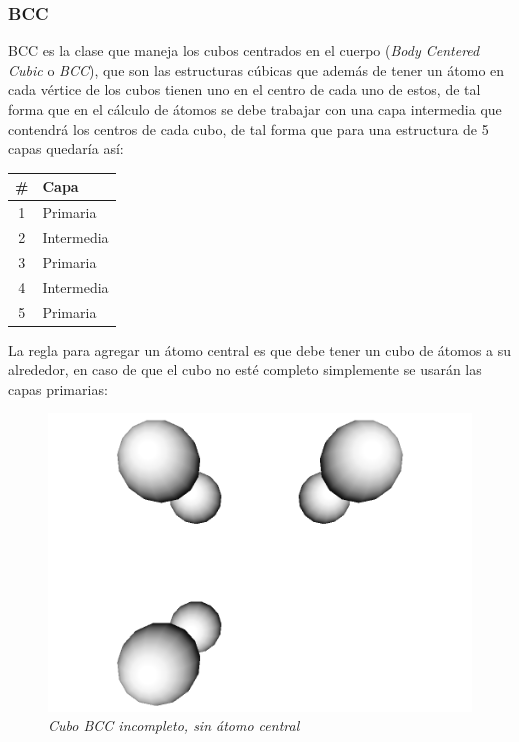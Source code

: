 \subsubsection{BCC}
BCC es la clase que maneja los cubos centrados en el cuerpo (\emph{Body Centered Cubic} o \emph{BCC}), que son las estructuras cúbicas que además de tener un átomo en cada vértice de los cubos tienen uno en el centro de cada uno de estos, de tal forma que en el cálculo de átomos se debe trabajar con una capa intermedia que contendrá los centros de cada cubo, de tal forma que para una estructura de 5 capas quedaría así:
\begin{center}
  \begin{tabular}{ c | l }
    \# & Capa \\
    \hline
    1 & Primaria \\
    2 & Intermedia \\
    3 & Primaria \\
    4 & Intermedia \\
    5 & Primaria \\
    \hline
  \end{tabular}
\end{center}

La regla para agregar un átomo central es que debe tener un cubo de átomos a su alrededor, en caso de que el cubo no esté completo simplemente se usarán las capas primarias:

\begin{figure}[H]
  \centering
  \includegraphics[scale=.3]{images/BCC-incomplete-molecule}
  \caption{\em Cubo BCC incompleto, sin átomo central}
\end{figure}

